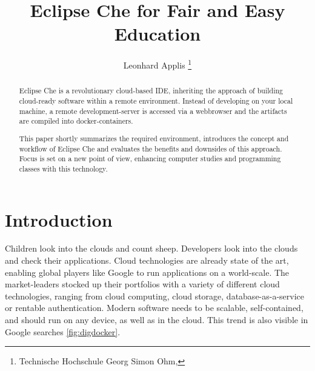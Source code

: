 \documentclass[utf8]{lni}
\begin{document}
\title[Eclipse Che for Education]{Eclipse Che for Fair and Easy Education}
\author[Leonhard Applis]
{Leonhard Applis \footnote{Technische Hochschule Georg Simon Ohm, }}
\maketitle

\begin{abstract}
Eclipse Che is a revolutionary cloud-based IDE, inheriting the approach of building cloud-ready software within a 
remote environment. 
Instead of developing on your local machine, a remote development-server is accessed via a webbrowser 
and the artifacts are compiled into docker-containers. 

This paper shortly summarizes the required environment, introduces the concept and workflow of Eclipse Che and evaluates 
the benefits and downsides of this approach. 
Focus is set on a new point of view, enhancing computer studies and 
programming classes with this technology. 
\end{abstract}


\section{Introduction}
\label{sec:Introduction}
Children look into the clouds and count sheep. 
Developers look into the clouds and check their applications.  
Cloud technologies are already state of the art, enabling global players like Google to run applications on a world-scale.
The market-leaders stocked up their portfolios with  a  variety  of  different  cloud  technologies,  ranging from cloud computing, cloud storage, database-as-a-service or rentable authentication. 
Modern software needs to be scalable, self-contained, and should run on any device, as well as in the cloud.  
This trend is also visible in Google searches \ref{fig:digdocker}. 
\end{document}
